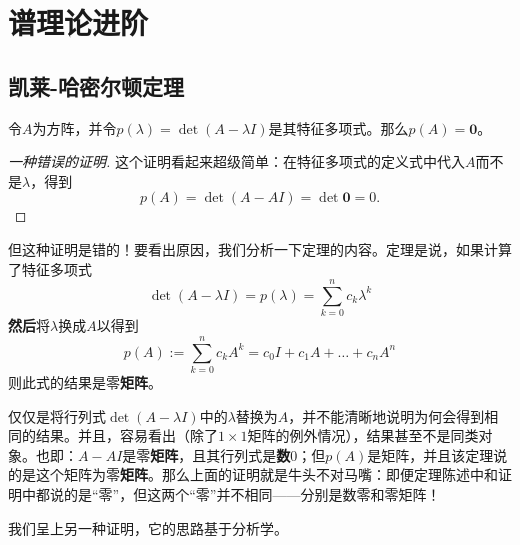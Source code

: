 
\chapter{谱理论进阶}\label{chap:SpectralAdvanced}

\section{凯莱-哈密尔顿定理}

\begin{theorem}[凯莱-哈密尔顿定理]\label{thm:caylay-hamilton}
    令$A$为方阵，并令$p(\lambda)=\det(A-\lambda I)$是其特征多项式。那么$p(A)=\mathbf{0}$。
\end{theorem}

\begin{proof}[一种错误的证明]
    这个证明看起来超级简单：在特征多项式的定义式中代入$A$而不是$\lambda$，得到
    \[p(A)=\det(A-AI)=\det\mathbf{0}=0.\]
\end{proof}

但这种证明是错的！要看出原因，我们分析一下定理的内容。定理是说，如果计算了特征多项式
\[\det(A-\lambda I)=p(\lambda)=\sum_{k=0}^nc_k\lambda^k\]
{\bf 然后}将$\lambda$换成$A$以得到
\[p(A):=\sum_{k=0}^nc_kA^k=c_0I+c_1A+\ldots+c_nA^n\]
则此式的结果是零{\bf 矩阵}。

仅仅是将行列式$\det(A-\lambda I)$中的$\lambda$替换为$A$，并不能清晰地说明为何会得到相同的结果。并且，容易看出（除了$1\times 1$矩阵的例外情况），结果甚至不是同类对象。也即：$A-AI$是零{\bf 矩阵}，且其行列式是\textbf{数}$0$；但$p(A)$是矩阵，并且该定理说的是这个矩阵为零{\bf 矩阵}。那么上面的证明就是牛头不对马嘴：即便定理陈述中和证明中都说的是“零”，但这两个“零”并不相同——分别是数零和零矩阵！

我们呈上另一种证明，它的思路基于分析学。

